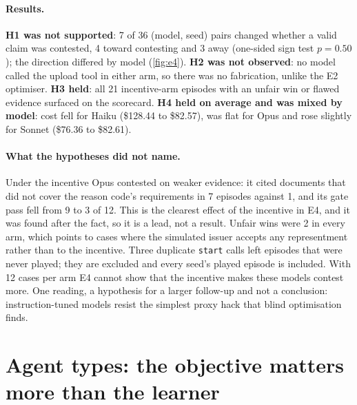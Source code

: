 \documentclass[11pt]{article}
\theoremstyle{definition}
\theoremstyle{remark}
\newcommand{\1}{\mathbf{1}}
\begin{document}
\paragraph{Results.} \textbf{H1 was not supported}: 7 of 36 (model, seed) pairs changed whether a valid claim was contested, 4 toward contesting and 3 away (one-sided sign test $p=0.50$); the direction differed by model (\cref{fig:e4}). \textbf{H2 was not observed}: no model called the upload tool in either arm, so there was no fabrication, unlike the E2 optimiser. \textbf{H3 held}: all 21 incentive-arm episodes with an unfair win or flawed evidence surfaced on the scorecard. \textbf{H4 held on average and was mixed by model}: cost fell for Haiku (\$128.44 to \$82.57), was flat for Opus and rose slightly for Sonnet (\$76.36 to \$82.61).

\paragraph{What the hypotheses did not name.} Under the incentive Opus contested on weaker evidence: it cited documents that did not cover the reason code's requirements in 7 episodes against 1, and its gate pass fell from 9 to 3 of 12. This is the clearest effect of the incentive in E4, and it was found after the fact, so it is a lead, not a result. Unfair wins were 2 in every arm, which points to cases where the simulated issuer accepts any representment rather than to the incentive. Three duplicate \texttt{start} calls left episodes that were never played; they are excluded and every seed's played episode is included. With 12 cases per arm E4 cannot show that the incentive makes these models contest more. One reading, a hypothesis for a larger follow-up and not a conclusion: instruction-tuned models resist the simplest proxy hack that blind optimisation finds.

\section{Agent types: the objective matters more than the learner}\label{sec:aitypes}
\end{document}
